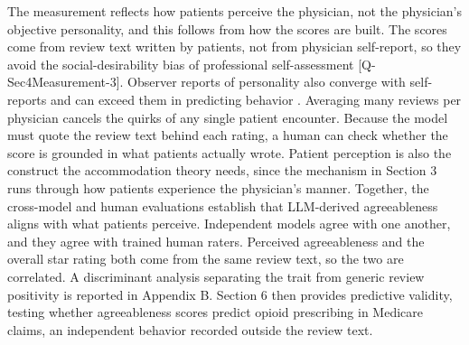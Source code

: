 The measurement reflects how patients perceive the physician, not the physician's objective personality, and this follows from how the scores are built. The scores come from review text written by patients, not from physician self-report, so they avoid the social-desirability bias of professional self-assessment \cite{TOADD} [Q-Sec4Measurement-3]. Observer reports of personality also converge with self-reports and can exceed them in predicting behavior \citep{connelly2010other}. Averaging many reviews per physician cancels the quirks of any single patient encounter. Because the model must quote the review text behind each rating, a human can check whether the score is grounded in what patients actually wrote. Patient perception is also the construct the accommodation theory needs, since the mechanism in Section 3 runs through how patients experience the physician's manner.
Together, the cross-model and human evaluations establish that LLM-derived agreeableness aligns with what patients perceive. Independent models agree with one another, and they agree with trained human raters. Perceived agreeableness and the overall star rating both come from the same review text, so the two are correlated. A discriminant analysis separating the trait from generic review positivity is reported in Appendix B. Section 6 then provides predictive validity, testing whether agreeableness scores predict opioid prescribing in Medicare claims, an independent behavior recorded outside the review text.
